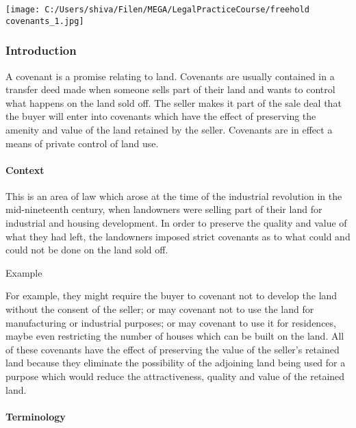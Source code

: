 \documentclass[
]{article}
\newenvironment{env-de3101d4-f08b-48eb-bc0e-2fa06f3bcf8e}
{
    \savenotes\tcolorbox[blanker,breakable,left=5pt,borderline west={2pt}{-4pt}{purple}]
}
{
    \endtcolorbox\spewnotes
}
\begin{document}
\texttt{[image: C:/Users/shiva/Filen/MEGA/LegalPracticeCourse/freehold covenants\_1.jpg]}

\hypertarget{introduction-1}{%
\subsubsection{Introduction}\label{introduction-1}}

A covenant is a promise relating to land. Covenants are usually
contained in a transfer deed made when someone sells part of their land
and wants to control what happens on the land sold off. The seller makes
it part of the sale deal that the buyer will enter into covenants which
have the effect of preserving the amenity and value of the land retained
by the seller. Covenants are in effect a means of private control of
land use.

\hypertarget{context}{%
\paragraph{Context}\label{context}}

This is an area of law which arose at the time of the industrial
revolution in the mid-nineteenth century, when landowners were selling
part of their land for industrial and housing development. In order to
preserve the quality and value of what they had left, the landowners
imposed strict covenants as to what could and could not be done on the
land sold off.

\begin{env-de3101d4-f08b-48eb-bc0e-2fa06f3bcf8e}

Example

For example, they might require the buyer to covenant not to develop the
land without the consent of the seller; or may covenant not to use the
land for manufacturing or industrial purposes; or may covenant to use it
for residences, maybe even restricting the number of houses which can be
built on the land. All of these covenants have the effect of preserving
the value of the seller's retained land because they eliminate the
possibility of the adjoining land being used for a purpose which would
reduce the attractiveness, quality and value of the retained land.

\end{env-de3101d4-f08b-48eb-bc0e-2fa06f3bcf8e}

\hypertarget{terminology}{%
\paragraph{Terminology}\label{terminology}}
\end{document}
